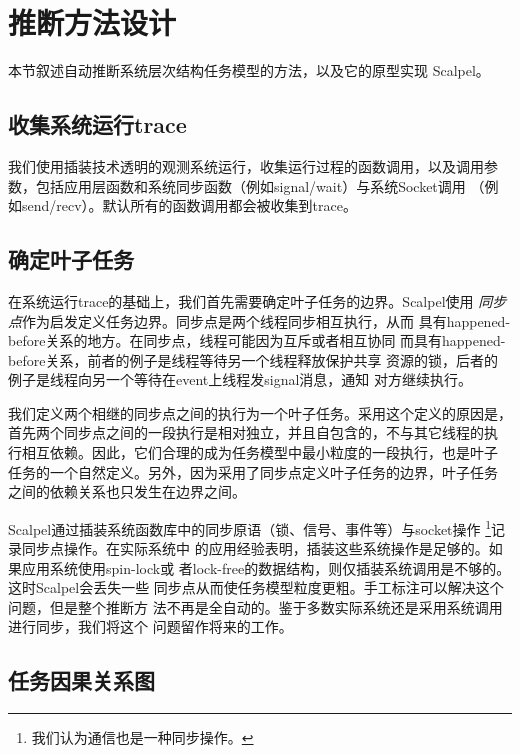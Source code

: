 \section{推断方法设计}
\label{sec:scp:design}

本节叙述自动推断系统层次结构任务模型的方法，以及它的原型实现
\pozhehao{}Scalpel。


\subsection{收集系统运行trace}

我们使用插装技术透明的观测系统运行，收集运行过程的函数调用，以及调用参
数，包括应用层函数和系统同步函数（例如signal/wait）与系统Socket调用
（例如send/recv）。默认所有的函数调用都会被收集到trace。


\subsection{确定叶子任务}

在系统运行trace的基础上，我们首先需要确定叶子任务的边界。Scalpel使用
\emph{同步点}作为启发定义任务边界。同步点是两个线程同步相互执行，从而
具有happened-before关系的地方。在同步点，线程可能因为互斥或者相互协同
而具有happened-before关系，前者的例子是线程等待另一个线程释放保护共享
资源的锁，后者的例子是线程向另一个等待在event上线程发signal消息，通知
对方继续执行。

我们定义两个相继的同步点之间的执行为一个叶子任务。采用这个定义的原因是，
首先两个同步点之间的一段执行是相对独立，并且自包含的，不与其它线程的执
行相互依赖。因此，它们合理的成为任务模型中最小粒度的一段执行，也是叶子
任务的一个自然定义。另外，因为采用了同步点定义叶子任务的边界，叶子任务
之间的依赖关系也只发生在边界之间。

Scalpel通过插装系统函数库中的同步原语（锁、信号、事件等）与socket操作
\footnote{我们认为通信也是一种同步操作。}记录同步点操作。在实际系统中
的应用经验表明，插装这些系统操作是足够的。如果应用系统使用spin-lock或
者lock-free的数据结构，则仅插装系统调用是不够的。这时Scalpel会丢失一些
同步点从而使任务模型粒度更粗。手工标注可以解决这个问题，但是整个推断方
法不再是全自动的。鉴于多数实际系统还是采用系统调用进行同步，我们将这个
问题留作将来的工作。

\subsection{任务因果关系图}

